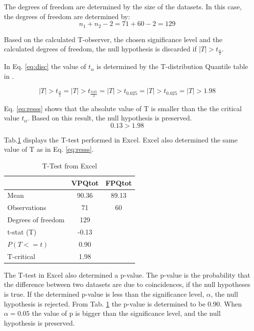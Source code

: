 The degrees of freedom are determined by the size of the datasets. In this case, the degrees of freedom are determined by: 
\begin{equation}
\label{eq:dof}
n_1+n_2-2 = 71 + 60 -2 = 129
\end{equation}

Based on the calculated T-observer, the chosen significance level and the calculated degrees of freedom, the null hypothesis is discarded if $|T|>t_{\frac{\alpha}{2}}$. \bigskip

In Eq. \ref{eq:disc} the value of $t_{\alpha}$ is determined by the T-distribution Quantile table in \cite{statistikk}. 

\begin{equation}
\label{eq:disc}
|T|>t_{\frac{\alpha}{2}} = |T|>t_{\frac{0.05}{2}} = |T|>t_{0.025} = |T|>t_{0.025} = |T|>1.98
\end{equation}

Eq. \ref{eq:resss} shows that the absolute value of T is smaller than the the critical value $t_{\alpha}$. Based on this result, the null hypothesis is preserved. 
\begin{equation}
\label{eq:resss}
   0.13>1.98 
\end{equation}

Tab.\ref{tab:ttest} displays the T-test performed in Excel. Excel also determined the same value of T as in Eq. \ref{eq:resss}.  

\begin{table}[H]
\caption{T-Test from Excel}
\label{tab:ttest}
\centering
\begin{tabular}{| l | c | c |} 
  \hline
  & VPQtot & FPQtot\\
 \hline
 Mean & 90.36 & 89.13 \\
 Observations & 71 & 60 \\
 \hline
 Degrees of freedom & 129 &  \\
 t-stat (T) & -0.13 & \\
 $P(T<=t)$  & 0.90 & \\
 T-critical & 1.98 &\\
 \hline
\end{tabular}
\end{table}\bigskip

The T-test in Excel also determined a p-value. The p-value is the probability that the difference between two datasets are due to coincidences, if the null hypotheses is true. If the determined p-value is less than the significance level, $\alpha$, the null hypothesis is rejected. From Tab. \ref{tab:ttest} the p-value is determined to be 0.90. When $\alpha=0.05$ the value of p is bigger than the significance level, and the null hypothesis is preserved. \bigskip

